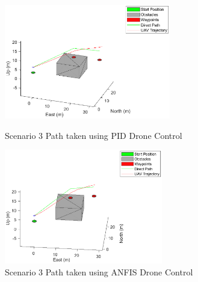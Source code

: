 \begin{figure}[H]
    \centering
    \begin{minipage}[b]{0.45\textwidth}
        \includegraphics[height=5cm,keepaspectratio]{img/scenario3_pid_paths.eps}
        \caption{Scenario 3 Path taken using PID Drone Control}
        \label{fig:Paths3_pid}
    \end{minipage}
    \hfill
    \begin{minipage}[b]{0.45\textwidth}
        \includegraphics[height=5cm,keepaspectratio]{img/scenario3_fis_paths.eps}
        \caption{Scenario 3 Path taken using ANFIS Drone Control}
        \label{fig:Paths3_fis}
    \end{minipage}
\end{figure}
